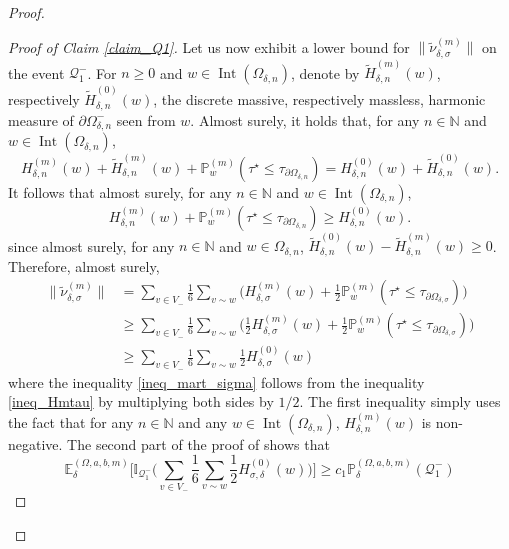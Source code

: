 \documentclass{article}
\newcommand{\PP}{{\mathbb{P}}}
\newcommand{\EE}{{\mathbb{E}}}
\theoremstyle{definition}
\theoremstyle{remark}
\theoremstyle{remark}
\begin{document}
\begin{proof}
\begin{proof}[Proof of Claim \ref{claim_Q1}]
Let us now exhibit a lower bound for $\| \tilde \nu_{\delta, \sigma}^{(m)} \|$ on the event $\mathcal{Q}_{1}^{-}$. For $n \geq 0$ and $w \in \operatorname{Int}(\Omega_{\delta, n})$, denote by $\tilde H_{\delta, n}^{(m)}(w)$, respectively $\tilde H_{\delta, n}^{(0)}(w)$, the discrete massive, respectively massless, harmonic measure of $\partial \Omega_{\delta, n}^{-}$ seen from $w$. Almost surely, it holds that, for any $n \in \mathbb{N}$ and $w \in \operatorname{Int}(\Omega_{\delta,n})$,
\begin{equation*}
    H_{\delta, n}^{(m)}(w) + \tilde H_{\delta, n}^{(m)}(w) + \PP_{w}^{(m)}(\tau^{\star} \leq \tau_{\partial \Omega_{\delta,n}}) = H_{\delta, n}^{(0)}(w) + \tilde H_{\delta, n}^{(0)}(w).
\end{equation*}
It follows that almost surely, for any $n \in \mathbb{N}$ and $w \in \operatorname{Int}(\Omega_{\delta,n})$,
\begin{equation} \label{ineq_Hmtau}
    H_{\delta, n}^{(m)}(w) + \PP_{w}^{(m)}(\tau^{\star} \leq \tau_{\partial \Omega_{\delta,n}}) \geq H_{\delta, n}^{(0)}(w).
\end{equation}
since almost surely, for any $n \in \mathbb{N}$ and $w \in \Omega_{\delta, n}$, $\tilde H_{\delta,n}^{(0)}(w) - \tilde H_{\delta,n}^{(m)}(w) \geq 0$. Therefore, almost surely,
\begin{align} \label{ineq_mart_sigma}
   \| \tilde \nu_{\delta, \sigma}^{(m)} \| &= \sum_{v \in V_{-}} \frac{1}{6} \sum_{v \sim w} \bigg(H_{\delta, \sigma}^{(m)}(w) + \frac{1}{2} \PP_{w}^{(m)}(\tau^{\star} \leq \tau_{\partial \Omega_{\delta,\sigma}}) \bigg) \nonumber \\
   &\geq \sum_{v \in V_{-}} \frac{1}{6} \sum_{v \sim w} \bigg( \frac{1}{2} H_{\delta, \sigma}^{(m)}(w) + \frac{1}{2} \PP_{w}^{(m)}(\tau^{\star} \leq \tau_{\partial \Omega_{\delta,\sigma}}) \bigg) \nonumber \\
    &\geq \sum_{v \in V_{-}} \frac{1}{6} \sum_{v \sim w} \frac{1}{2} H_{\delta, \sigma}^{(0)}(w)
\end{align}
where the inequality \eqref{ineq_mart_sigma} follows from the inequality \eqref{ineq_Hmtau} by multiplying both sides by $1/2$. The first inequality simply uses the fact that for any $n \in \mathbb{N}$ and any $w \in \operatorname{Int}(\Omega_{\delta,n})$, $H_{\delta,n}^{(m)}(w)$ is non-negative. The second part of the proof of \cite[Proposition~6.3]{HE} shows that
\begin{equation*}
    \EE_{\delta}^{(\Omega,a,b,m)} \bigg[ \mathbb{I}_{\mathcal{Q}_{1}^{-}}\bigg(\sum_{v \in V_{-}} \frac{1}{6} \sum_{v \sim w} \frac{1}{2} H_{\sigma, \delta}^{(0)}(w) \bigg) \bigg] \geq c_1\PP_{\delta}^{(\Omega,a,b,m)}(\mathcal{Q}_{1}^{-})

\end{equation*}
\end{proof}
\end{proof}
\end{document}

